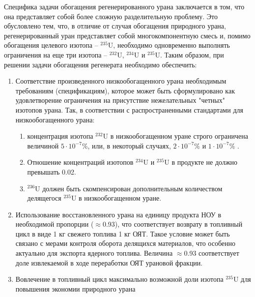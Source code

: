 Специфика задачи обогащения регенерированного урана заключается в том, что она представляет собой более сложную разделительную проблему.
Это обусловлено тем, что, в отличие от случая обогащения природного урана, регенерированный уран представляет собой многокомпонентную смесь и, помимо обогащения целевого изотопа -- $^{235}$U, необходимо одновременно выполнять ограничения на еще три изотопа -- $^{232}$U, $^{234}$U и $^{235}$U.
Таким образом, при решении задачи обогащения регенерата необходимо обеспечить:
\begin{enumerate}
  \item Соответствие произведенного низкообогащенного урана необходимым требованиям (спецификациям), которое может быть сформулировано как удовлетворение ограничения на присутствие нежелательных "четных" изотопов урана. Так, в соответствии с распространенными стандартами для низкообогащенного урана:
  \begin{enumerate}
    \item концентрация изотопа $^{232}$U в низкообогащенном уране строго ограничена величиной $5\cdot10^{-7}$\%, или, в некоторый случаях, $2\cdot10^{-7}$\% и $1\cdot10^{-7}$\% \cite{smirnovKaskadnyeShemyZadachah2012, c26committeeSpecificationUraniumHexafluoride}.
    \item Отношение концентраций изотопов $^{234}$U и $^{235}$U в продукте не должно превышать 0.02.
    \item $^{236}$U должен быть скомпенсирован дополнительным количеством делящегося $^{235}$U в низкообогащенном уране.
  \end{enumerate}
  \item Использование восстановленного урана на единицу продукта НОУ в необходимой пропорции ($\approx$0.93), что соответствует возврату в топливный цикл в виде 1 кг свежего топлива 1 кг ОЯТ. Такое условие может быть связано с мерами контроля оборота делящихся материалов, что особенно актуально для экспорта ядерного топлива. Величина  $\approx$0.93 соответствует доле извлекаемой в ходе переработки ОЯТ урановой фракции.
  \item Вовлечение в топливный цикл максимально возможной доли изотопа $^{235}$U для повышения экономии природного урана
\end{enumerate}


